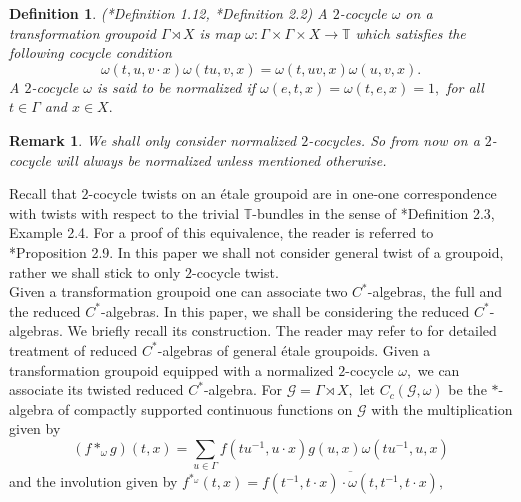 \documentclass[a4paper,11pt,reqno]{amsart}
\theoremstyle{plain}
\newtheorem{defn}[thm]{Definition}
\newtheorem{rem}[thm]{Remark}
\theoremstyle{mainthmstyle}
\theoremstyle{named}
\numberwithin{equation}{section}
\begin{document}
\begin{defn}(\cite{renault1980groupoid}*{Definition 1.12}, \cite{ARMSTRONG2022109551}*{Definition 2.2})
A $2$-cocycle $\omega$ on a transformation groupoid $\Gamma \rtimes X$ is map $\omega : \Gamma \times \Gamma \times X \rightarrow \mathbb T$ which satisfies the following cocycle condition \begin{displaymath}
\omega (t, u, v \cdot x) \omega (t u, v, x) = \omega (t, u v, x) \omega (u, v, x).\end{displaymath}
A $2$-cocycle $\omega$ is said to be normalized if $\omega (e, t, x) = \omega (t, e, x) = 1,$ for all $t \in \Gamma$ and $x \in X.$
\end{defn}
\begin{rem}
    We shall only consider normalized $2$-cocycles. So from now on a $2$-cocycle will always be normalized unless mentioned otherwise.
\end{rem}
Recall that $2$-cocycle twists on an étale groupoid are in one-one correspondence with twists with respect to the trivial $\mathbb{T}$-bundles in the sense of \cite{Weygandt-2024-Rapid-decay-for-etale-gpd}*{Definition 2.3, Example 2.4}. For a proof of this equivalence, the reader is referred to \cite{ARMSTRONG2022109551}*{Proposition 2.9}. In this paper we shall not consider general twist of a groupoid, rather we shall stick to only $2$-cocycle twist.\vspace{0.1in}\\
Given a transformation groupoid one can associate two $C^{\ast}$-algebras, the full and the reduced $C^{\ast}$-algebras. In this paper, we shall be considering the reduced $C^{\ast}$-algebras. We briefly recall its construction. The reader may refer to \cites{williams2019tool, renault1980groupoid, brownc, Weygandt-2024-Rapid-decay-for-etale-gpd, sims2020operator} for detailed treatment of reduced $C^{\ast}$-algebras of general \'etale groupoids. Given a transformation groupoid equipped with a normalized $2$-cocycle $\omega,$ we can associate its twisted reduced $C^{\ast}$-algebra. For $\mathcal G = \Gamma \rtimes X,$ let $C_c (\mathcal G, \omega)$ be the $\ast$-algebra of compactly supported continuous functions on $\mathcal G$ with the multiplication given by 
\begin{displaymath}(f \ast_{\omega} g) (t, x) = \sum\limits_{u \in \Gamma} f \left (t u^{-1}, u \cdot x \right ) g (u, x) \omega \left (t u^{-1}, u, x \right )\end{displaymath}
and the involution given by
$f^{\ast_{\omega}} (t, x) = \overline {f \left (t^{-1}, t \cdot x \right ) \cdot \omega (t, t^{-1}, t \cdot x)},$
\end{document}

